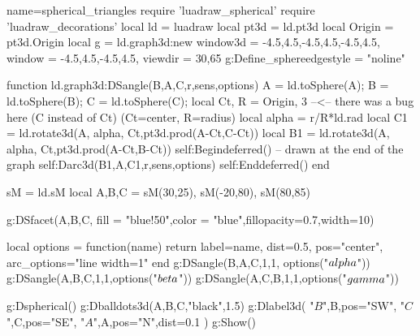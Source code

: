 \documentclass{standalone}
\begin{document}
\begin{luadraw}{name=spherical_triangles}
require 'luadraw_spherical'
require 'luadraw_decorations'
local ld = luadraw
local pt3d = ld.pt3d
local Origin = pt3d.Origin
local g = ld.graph3d:new{
    window3d = {-4.5,4.5,-4.5,4.5,-4.5,4.5},
    window = {-4.5,4.5,-4.5,4.5},
    viewdir = {30,65}
}
g:Define_sphere{edgestyle = "noline"}

function ld.graph3d:DSangle(B,A,C,r,sens,options)
    A = ld.toSphere(A); B = ld.toSphere(B); C = ld.toSphere(C); 
    local Ct, R = Origin, 3 --<-- there was a bug here (C instead of Ct) (Ct=center, R=radius)
    local alpha = r/R*ld.rad
    local C1 = ld.rotate3d(A, alpha, {Ct,pt3d.prod(A-Ct,C-Ct)})
    local B1 = ld.rotate3d(A, alpha, {Ct,pt3d.prod(A-Ct,B-Ct)})
    self:Begindeferred() -- drawn at the end of the graph
        self:Darc3d(B1,A,C1,r,sens,options)
    self:Enddeferred()
end

sM = ld.sM
local A,B,C = sM(30,25), sM(-20,80), sM(80,85)

g:DSfacet({A,B,C}, {fill = "blue!50",color = "blue",fillopacity=0.7,width=10})

local options = function(name)
    return {label=name, dist=0.5, pos="center", arc_options="line width=1"}
end
g:DSangle(B,A,C,1,1, options("$\\alpha$"))
g:DSangle(A,B,C,1,1,options("$\\beta$"))
g:DSangle(A,C,B,1,1,options("$\\gamma$"))

g:Dspherical()
g:Dballdots3d({A,B,C},"black",1.5)
g:Dlabel3d(
    "$B$",B,{pos="SW"},
    "$C$",C,{pos="SE"},
    "$A$",A,{pos="N",dist=0.1}
)
g:Show()
\end{luadraw}
\end{document}
